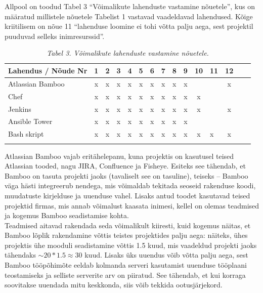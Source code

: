 \documentclass[12pt]{report}
\begin{document}
  Allpool on toodud Tabel 3 ``Võimalikute lahenduste vastamine nõuetele'', kus on määratud millistele nõuetele Tabelist 1 vastavad vaadeldavad lahendused. Kõige kriitilisem on nõue 11 ``lahenduse loomine ei tohi võtta palju aega, sest projektil puuduvad selleks inimresurssid''.
  
  \begin{table}[H]
    \caption*{\textit{Tabel 3. Võimalikute lahenduste vastamine nõuetele.}}
    
    \begin{tabular}{ |l|c|c|c|c|c|c|c|c|c|c V{4} c V{4} c| }
      \hline
      \textbf{Lahendus / Nõude Nr} & \textbf{1} & \textbf{2} & \textbf{3} & \textbf{4} & \textbf{5} & \textbf{6} & \textbf{7} & \textbf{8} & \textbf{9} & \textbf{10} & \textbf{11} & \textbf{12}\\
      \hline
      Atlassian Bamboo & x & x & x & x & x & x & x & x & x & & & x\\
      \hline
      Chef & x & x & x & x & x & x & x & x & x & x & & \\
      \hline
      Jenkins & x & x & x & x & x & x & x & x & x & x & & x\\
      \hline
      Ansible Tower & x & x & x & x & x & x & x & x & x & & & \\
      \hline
      Bash skript & x & x & x & x & x & x & x & x & x & x & x & x\\
      \hline
    \end{tabular}
  \end{table}

  Atlassian Bamboo vajab eritähelepanu, kuna projektis on kasutusel teised Atlassian tooded, nagu JIRA, Confluence ja Fisheye. Esiteks see tähendab, et Bamboo on tasuta projekti jaoks (tavaliselt see on tasuline), teiseks \--- Bamboo väga hästi integreerub nendega, mis võimaldab tekitada seoseid rakenduse koodi, muudatuste kirjelduse ja uuenduse vahel. Lisaks antud toodet kasutavad teised projektid firmas, mis annab võimalust kaasata inimesi, kellel on olemas teadmised ja kogemus Bamboo seadistamise kohta.\\
  
  Teadmised aitavad rakendada seda võimalikult kiiresti, kuid kogemus näitas, et Bamboo lõplik rakendamine võttis teistes projektides palju aega: näiteks, ühes projektis ühe mooduli seadistamine võttis 1.5 kuud, mis vaadeldud projekti jaoks tähendaks $\sim20*1.5 \approx 30$ kuud. Lisaks üks uuendus võib võtta palju aega, sest Bamboo tööpõhimõte eeldab kolmanda serveri kasutamist uuenduse tööplaani teostamiseks ja selliste serverite arv on piiratud. See tähendab, et kui korraga soovitakse uuendada mitu keskkonda, siis võib tekkida ootusjärjekord.\\
  
\end{document}
